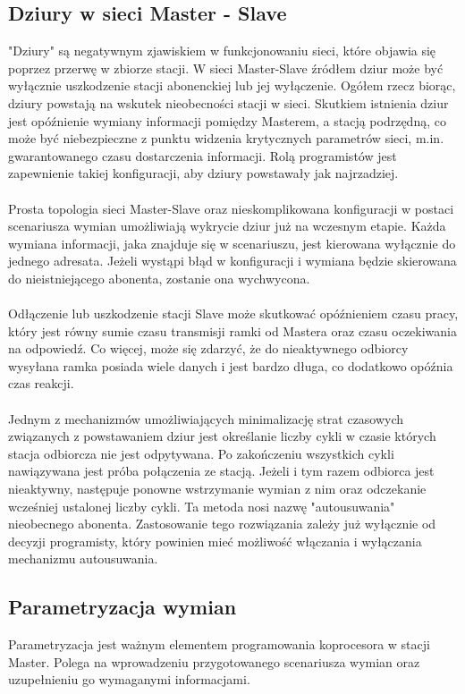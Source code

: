 \documentclass[a4paper,twoside]{article}
\begin{document}
\subsection{Dziury w sieci Master - Slave}
\label{subsec:dziury}
"Dziury" są negatywnym zjawiskiem w funkcjonowaniu sieci, które objawia się poprzez przerwę w zbiorze stacji. W sieci Master-Slave źródłem dziur może być wyłącznie uszkodzenie stacji abonenckiej lub jej wyłączenie. Ogółem rzecz biorąc, dziury powstają na wskutek nieobecności stacji w sieci. Skutkiem istnienia dziur jest opóźnienie wymiany informacji pomiędzy Masterem, a stacją podrzędną, co może być niebezpieczne z punktu widzenia krytycznych parametrów sieci, m.in. gwarantowanego czasu dostarczenia informacji. Rolą programistów jest zapewnienie takiej konfiguracji, aby dziury powstawały jak najrzadziej.\\\\
Prosta topologia sieci Master-Slave oraz nieskomplikowana konfiguracji w postaci scenariusza wymian umożliwiają wykrycie dziur już na wczesnym etapie. Każda wymiana informacji, jaka znajduje się w scenariuszu, jest kierowana wyłącznie do jednego adresata. Jeżeli wystąpi błąd w konfiguracji i wymiana będzie skierowana do nieistniejącego abonenta, zostanie ona wychwycona.\\\\
Odłączenie lub uszkodzenie stacji Slave może skutkować opóźnieniem czasu pracy, który jest równy sumie czasu transmisji ramki od Mastera oraz czasu oczekiwania na odpowiedź. Co więcej, może się zdarzyć, że do nieaktywnego odbiorcy wysyłana ramka posiada wiele danych i jest bardzo długa, co dodatkowo opóźnia czas reakcji.\\\\
Jednym z mechanizmów umożliwiających minimalizację strat czasowych związanych z powstawaniem dziur jest określanie liczby cykli w czasie których stacja odbiorcza nie jest odpytywana. Po zakończeniu wszystkich cykli nawiązywana jest próba połączenia ze stacją. Jeżeli i tym razem odbiorca jest nieaktywny, następuje ponowne wstrzymanie wymian z nim oraz odczekanie wcześniej ustalonej liczby cykli. Ta metoda nosi nazwę "autousuwania" nieobecnego abonenta. Zastosowanie tego rozwiązania zależy już wyłącznie od decyzji programisty, który powinien mieć możliwość włączania i wyłączania mechanizmu autousuwania.

\subsection{Parametryzacja wymian}
Parametryzacja jest ważnym elementem programowania koprocesora w stacji Master. Polega na wprowadzeniu przygotowanego scenariusza wymian oraz uzupełnieniu go wymaganymi informacjami.
\end{document}
